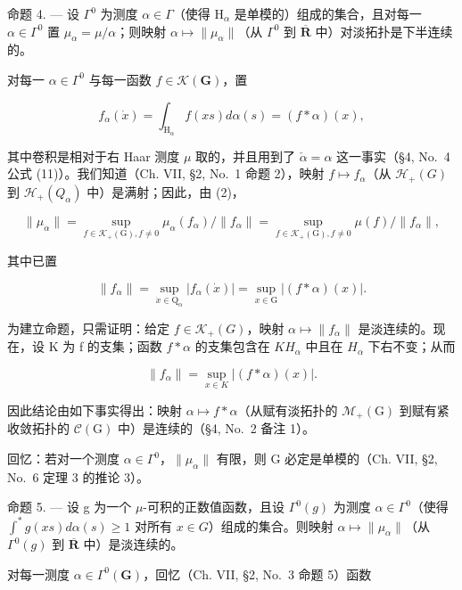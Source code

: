 命题 4. --- 设 \(\Gamma^0\) 为测度 \(\alpha \in \Gamma\)（使得 \(\mathrm{H}_{\alpha}\) 是单模的）组成的集合，且对每一 \(\alpha \in \Gamma^0\) 置 \(\mu_{\alpha} = \mu / \alpha\)；则映射 \(\alpha \mapsto \| \mu_{\alpha} \|\)（从 \(\Gamma^0\) 到 \(\overline{\mathbf{R}}\) 中）对淡拓扑是下半连续的。

对每一 \(\alpha \in \Gamma^0\) 与每一函数 \(f\in \mathcal{K}(\mathbf{G})\)，置

\[
f _ {\alpha} (\dot {x}) = \int_ {\mathrm{H} _ {\alpha}} f (x s) d \alpha (s) = (f * \alpha) (x),
\]

其中卷积是相对于右 Haar 测度 \(\mu\) 取的，并且用到了 \(\check{\alpha} = \alpha\) 这一事实（§4, No.~4 公式 (11)）。我们知道（Ch. VII, §2, No.~1 命题 2），映射 \(f \mapsto f_{\alpha}\)（从 \(\mathcal{H}_{+}(G)\) 到 \(\mathcal{H}_{+}(Q_{\alpha})\) 中）是满射；因此，由 (2)，

\[
\| \mu_ {\alpha} \| = \sup _ {f \in \mathcal {K} _ {+} (\mathrm{G}), f \neq 0} \mu_ {\alpha} (f _ {\alpha}) / \| f _ {\alpha} \| = \sup _ {f \in \mathcal {K} _ {+} (\mathrm{G}), f \neq 0} \mu (f) / \| f _ {\alpha} \|,
\]

其中已置

\[
\left\| f _ {\alpha} \right\| = \sup _ {\dot {x} \in \mathrm{Q} _ {\alpha}} | f _ {\alpha} (\dot {x}) | = \sup _ {x \in \mathrm{G}} | (f * \alpha) (x) |.\tag{3}
\]

为建立命题，只需证明：给定 \(f \in \mathcal{K}_{+}(G)\)，映射 \(\alpha \mapsto \|f_{\alpha}\|\) 是淡连续的。现在，设 K 为 f 的支集；函数 \(f * \alpha\) 的支集包含在 \(KH_{\alpha}\) 中且在 \(H_{\alpha}\) 下右不变；从而

\[
\left\| f _ {\alpha} \right\| = \sup _ {x \in K} | (f * \alpha) (x) |.
\]

因此结论由如下事实得出：映射 \(\alpha\mapsto f*\alpha\)（从赋有淡拓扑的 \(\mathcal{M}_{+}(\mathrm{G})\) 到赋有紧收敛拓扑的 \(\mathcal{C}(\mathrm{G})\) 中）是连续的（§4, No.~2 备注 1）。

回忆：若对一个测度 \(\alpha \in \Gamma^0\)，\(\| \mu_{\alpha}\|\) 有限，则 G 必定是单模的（Ch. VII, §2, No.~6 定理 3 的推论 3）。

命题 5. --- 设 g 为一个 \(\mu\)-可积的正数值函数，且设 \(\Gamma^{0}(g)\) 为测度 \(\alpha\in\Gamma^{0}\)（使得 \(\int^{*}g(xs)d\alpha(s)\geqslant1\) 对所有 \(x\in G\)）组成的集合。则映射 \(\alpha\mapsto\|\mu_{\alpha}\|\)（从 \(\Gamma^{0}(g)\) 到 \(\overline{\mathbf{R}}\) 中）是淡连续的。

对每一测度 \(\alpha \in \Gamma^0 (\mathbf{G})\)，回忆（Ch. VII, §2, No.~3 命题 5）函数

